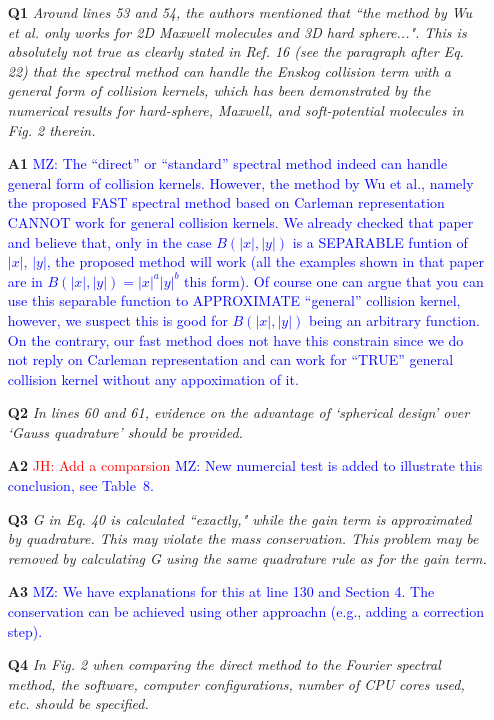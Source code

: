 \documentclass[11pt]{article}
\newcommand{\jh}[1]{\textcolor{red}{JH: #1}}
\newcommand{\mz}[1]{\textcolor{blue}{MZ: #1}}
\begin{document}
\begin{itemize}
\item[{\bf Q1}]  {\it Around lines 53 and 54, the authors mentioned that ``the method by Wu et al. only works for 2D Maxwell molecules and 3D hard sphere...". This is absolutely not true as clearly stated in Ref. 16 (see the paragraph after Eq. 22) that the spectral method can handle the Enskog collision term with a general form of collision kernels, which has been demonstrated by the numerical results for hard-sphere, Maxwell, and soft-potential molecules in Fig. 2 therein.}

\item[{\bf A1}] \mz{The ``direct'' or ``standard'' spectral method indeed can handle general form of collision kernels. However, the method by Wu et al., namely the proposed FAST spectral method based on Carleman representation CANNOT work for general collision kernels. We already checked that paper and believe that, only in the case $B(|x|, |y|)$ is a SEPARABLE funtion of $|x|$, $|y|$, the proposed method will work (all the examples shown in that paper are in $B(|x|, |y|) = |x|^a |y|^b$ this form). Of course one can argue that you can use this separable function to APPROXIMATE ``general'' collision kernel, however, we suspect this is good for $B(|x|, |y|)$ being an arbitrary function. On the contrary, our fast method does not have this constrain since we do not reply on Carleman representation and can work for ``TRUE'' general collision kernel without any appoximation of it.}

\item[{\bf Q2}] {\it In lines 60 and 61, evidence on the advantage of `spherical design' over `Gauss quadrature' should be provided.}

\item[{\bf A2}]  \jh{Add a comparsion} \mz{New numercial test is added to illustrate this conclusion, see Table~8.}

\item[{\bf Q3}] {\it G in Eq. 40 is calculated ``exactly," while the gain term is approximated by quadrature. This may violate the mass conservation. This problem may be removed by calculating G using the same quadrature rule as for the gain term.
}

\item[{\bf A3}] \mz{We have explanations for this at line 130 and Section 4. The conservation can be achieved using other approachn (e.g., adding a correction step).}

\item[{\bf Q4}] {\it In Fig. 2 when comparing the direct method to the Fourier spectral method, the software, computer configurations, number of CPU cores used, etc. should be specified.  }


\end{itemize}
\end{document}

